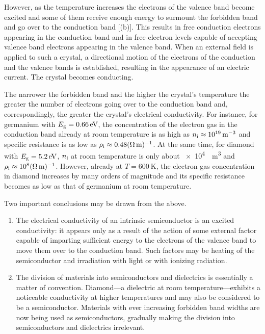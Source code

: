 However, as the temperature increases the electrons of the valence band become excited and some of them receive enough energy to surmount the forbidden band and go over to the conduction band [(b)]. This results in free conduction electrons appearing in
the conduction band and in free electron levels capable of accepting valence band electrons appearing in the valence band. When an external field is applied to such a crystal, a directional motion of the electrons of the conduction and the valence bands is established, resulting in the appearance of an electric current. The crystal becomes conducting.

The narrower the forbidden band and the higher the crystal's temperature the greater the number of electrons going over to the conduction band and, correspondingly, the greater the crystal's electrical conductivity. For instance, for germanium with $E_{\text{g}}=\SI{0.66}{\electronvolt}$, the concentration of the electron gas in the conduction band already at room temperature is as high as $n_{\text{i}}\approx\SI{e19}{\per\metre\cubed}$ and specific resistance is as low as $\rho_{\text{i}}\approx\num{0.48}(\si{\ohm\metre})^{-1}$.
At the same time, for diamond with $E_{\text{g}}=\SI{5.2}{\electronvolt}$, $n_{\text{i}}$ at room temperature is only about \SI{e4}{\per\metre\cubed} and $\rho_{\text{i}}\approx\num{e8}(\si{\ohm\metre})^{-1}$. However, already at $T=\SI{600}{\kelvin}$, the electron gas concentration in diamond increases by many orders of magnitude and its specific resistance becomes as low as that of germanium at room temperature.

Two important conclusions may be drawn from the above.
\begin{enumerate}[(1)]
    \item The electrical conductivity of an intrinsic semiconductor is an excited conductivity: it appears only as a result of the action of some external factor capable of imparting sufficient energy to the electrons of the valence band to move them over to the conduction
    band. Such factors may be heating of the semiconductor and irradiation with light or with ionizing radiation.

    \item The division of materials into semiconductors and dielectrics is essentially a matter of convention. Diamond---a dielectric at room     temperature---exhibits a noticeable conductivity at higher temperatures and may also be considered to be a semiconductor. Materials with ever increasing forbidden band widths are now being used as semiconductors, gradually making the division into semiconductors and dielectrics irrelevant.
\end{enumerate}

